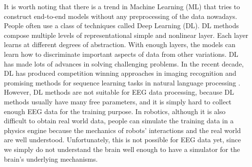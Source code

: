 \documentclass[a4paper,11pt,oneside]{article}
\begin{document}
It is worth noting that there is a trend in Machine Learning (ML)   that tries to construct end-to-end models without any preprocessing of the data nowadays. People often use a class of techniques called Deep Learning (DL).  DL methods compose multiple levels of representational simple and nonlinear layer. Each layer learns at different degrees of abstraction. With enough layers, the models can learn how to discriminate important aspects of data from other variations. DL has made lots of advances in solving challenging problems. In the recent decade, DL has produced competition winning approaches in imaging recognition \cite{krizhevsky2012imagenet}\cite{farabet2013learning} and promising methods for sequence learning tasks in natural language processing \cite{bordes2014question} \cite{luong2014addressing}. However, DL methods are not suitable for EEG data processing, because DL methods usually have many free parameters, and it is simply hard to collect enough EEG data for the training purpose. In robotics, although it is also difficult to obtain real world data, people can simulate the training data in a physics engine because the mechanics of robots' interactions and the real world are well understood. Unfortunately, this is not possible for EEG data yet, since we simply do not understand the brain well enough to have a simulator for the brain's underlying mechanisms.
\end{document}
